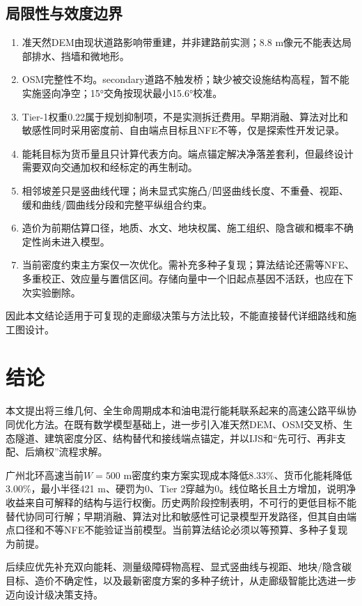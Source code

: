 \documentclass[preprint,12pt]{elsarticle}
\begin{document}
\subsection{局限性与效度边界}

\begin{enumerate}[leftmargin=*,label=(\arabic*)]
\item 准天然DEM由现状道路影响带重建，并非建路前实测；8.8 m像元不能表达局部排水、挡墙和微地形。
\item OSM完整性不均。secondary道路不触发桥；缺少被交设施结构高程，暂不能实施竖向净空；15°交角按现状最小15.6°校准。
\item Tier-1权重0.22属于规划抑制项，不是实测拆迁费用。早期消融、算法对比和敏感性同时采用密度前、自由端点目标且NFE不等，仅是探索性开发记录。
\item 能耗目标为货币量且只计算代表方向。端点锚定解决净落差套利，但最终设计需要双向交通加权和经标定的再生制动。
\item 相邻坡差只是竖曲线代理；尚未显式实施凸/凹竖曲线长度、不重叠、视距、缓和曲线/圆曲线分段和完整平纵组合约束。
\item 造价为前期估算口径，地质、水文、地块权属、施工组织、隐含碳和概率不确定性尚未进入模型。
\item 当前密度约束主方案仅一次优化。需补充多种子复现；算法结论还需等NFE、多重校正、效应量与置信区间。存储向量中一个旧起点基因不活跃，也应在下次实验删除。
\end{enumerate}

因此本文结论适用于可复现的走廊级决策与方法比较，不能直接替代详细路线和施工图设计。

\section{结论}

本文提出将三维几何、全生命周期成本和油电混行能耗联系起来的高速公路平纵协同优化方法。在既有数学模型基础上，进一步引入准天然DEM、OSM交叉桥、生态隧道、建筑密度分区、结构替代和接线端点锚定，并以IJS和“先可行、再非支配、后熵权”流程求解。

广州北环高速当前$W=500$ m密度约束方案实现成本降低8.33\%、货币化能耗降低3.00\%，最小半径421 m、硬罚为0、Tier 2穿越为0。线位略长且土方增加，说明净收益来自可解释的结构与运行权衡。历史两阶段控制表明，不可行的更低目标不能替代协同可行解；早期消融、算法对比和敏感性可记录模型开发路径，但其自由端点口径和不等NFE不能验证当前模型。当前算法结论必须以等预算、多种子复现为前提。

后续应优先补充双向能耗、测量级障碍物高程、显式竖曲线与视距、地块/隐含碳目标、造价不确定性，以及最新密度方案的多种子统计，从走廊级智能比选进一步迈向设计级决策支持。
\end{document}
